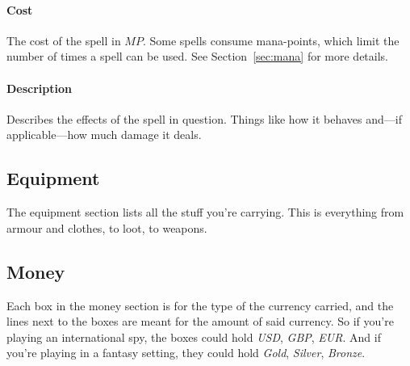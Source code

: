 \paragraph{Cost} The cost of the spell in $MP$.
Some spells consume mana-points, which limit the number of times a spell can be used.
See Section~\ref{sec:mana} for more details.

\paragraph{Description} Describes the effects of the spell in question.
Things like how it behaves and---if applicable---how much damage it deals.

\subsection{Equipment}
The equipment section lists all the stuff you're carrying.
This is everything from armour and clothes, to loot, to weapons.

\subsection{Money}
Each box in the money section is for the type of the currency carried, and the lines next to the boxes are meant for the amount of said currency.
So if you're playing an international spy, the boxes could hold \textit{USD}, \textit{GBP}, \textit{EUR}.
And if you're playing in a fantasy setting, they could hold \textit{Gold}, \textit{Silver}, \textit{Bronze}.